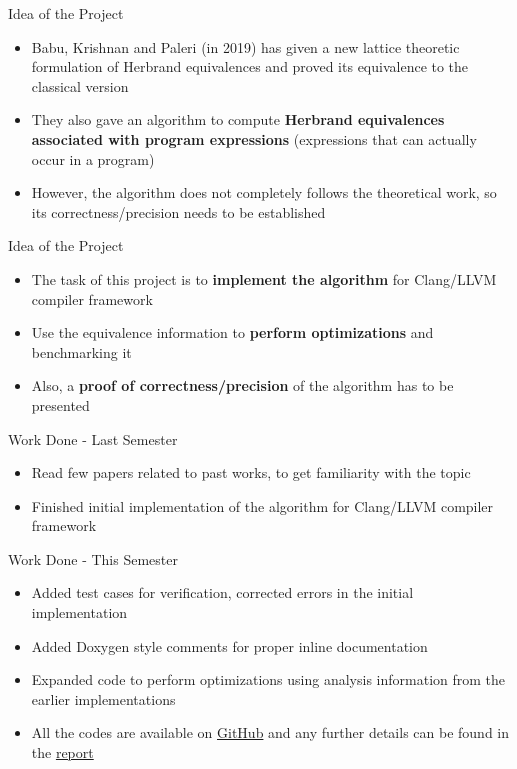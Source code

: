 \documentclass[11pt]{beamer}
\begin{document}
\begin{frame}{Idea of the Project}
    \begin{itemize}
        \item Babu, Krishnan and Paleri (in 2019) has given a new lattice theoretic formulation of Herbrand equivalences and proved its equivalence to the classical version
        \item They also gave an algorithm to compute \textbf{Herbrand equivalences associated with program expressions} (expressions that can actually occur in a program)
        \item However, the algorithm does not completely follows the theoretical work, so its correctness/precision needs to be established
    \end{itemize}
\end{frame}

\begin{frame}{Idea of the Project}
    \begin{itemize}
        \item The task of this project is to \textbf{implement the algorithm} for Clang/LLVM compiler framework
        \item Use the equivalence information to \textbf{perform optimizations} and benchmarking it
        \item Also, a \textbf{proof of correctness/precision} of the algorithm has to be presented
    \end{itemize}
\end{frame}

\begin{frame}{Work Done - Last Semester}
    \begin{itemize}
        \item Read few papers related to past works, to get familiarity with the topic
        \item Finished initial implementation of the algorithm for Clang/LLVM compiler framework
    \end{itemize}
\end{frame}

\begin{frame}{Work Done - This Semester}
    \begin{itemize}
        \item Added test cases for verification, corrected errors in the initial implementation
        \item Added Doxygen style comments for proper inline documentation
        \item Expanded code to perform optimizations using analysis information from the earlier implementations
        \item All the codes are available on \href{https://github.com/himanshu520/HerbrandEquivalence}{GitHub} and any further details can be found in the \href{https://github.com/himanshu520/HerbrandEquivalence}{report}
    \end{itemize}
\end{frame}
\end{document}
